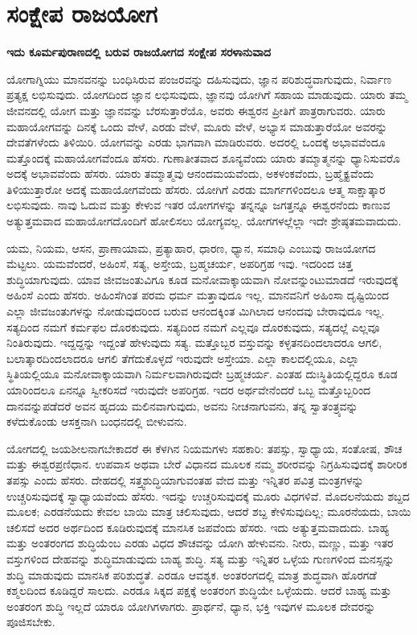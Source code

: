 \chapter{ಸಂಕ್ಷೇಪ ರಾಜಯೋಗ}

\centerline{\textbf{ಇದು ಕೂರ್ಮಪುರಾಣದಲ್ಲಿ ಬರುವ ರಾಜಯೋಗದ ಸಂಕ್ಷೇಪ ಸರಳಾನುವಾದ}}

ಯೋಗಾಗ್ನಿಯು ಮಾನವನನ್ನು ಬಂಧಿಸಿರುವ ಪಂಜರವನ್ನು ದಹಿಸುವುದು, ಜ್ಞಾನ ಪರಿಶುದ್ಧವಾಗುವುದು, ನಿರ್ವಾಣ ಪ್ರತ್ಯಕ್ಷ ಲಭಿಸುವುದು. ಯೋಗದಿಂದ ಜ್ಞಾನ ಲಭಿಸುವುದು, ಜ್ಞಾನವು ಯೋಗಿಗೆ ಸಹಾಯ ಮಾಡುವುದು. ಯಾರು ತಮ್ಮ ಜೀವನದಲ್ಲಿ ಯೋಗ ಮತ್ತು ಜ್ಞಾನವನ್ನು ಬೆರಸುತ್ತಾರೆಯೊ, ಅವರು ಈಶ್ವರನ ಪ್ರೀತಿಗೆ ಪಾತ್ರರಾಗುವರು. ಯಾರು ಮಹಾಯೋಗವನ್ನು ದಿನಕ್ಕೆ ಒಂದು ವೇಳೆ, ಎರಡು ವೇಳೆ, ಮೂರು ವೇಳೆ, ಅಭ್ಯಾಸ ಮಾಡುತ್ತಾರೆಯೋ ಅವರನ್ನು ದೇವತೆಗಳೆಂದು ತಿಳಿಯಿರಿ. ಯೋಗವನ್ನು ಎರಡು ಭಾಗವಾಗಿ ಮಾಡಿರುವರು. ಅದರಲ್ಲಿ ಒಂದಕ್ಕೆ ಅಭಾವವೆಂದೂ ಮತ್ತೊಂದಕ್ಕೆ ಮಹಾಯೋಗವೆಂದೂ ಹೆಸರು. ಗುಣಾತೀತವಾದ ಶೂನ್ಯವೆಂದು ಯಾರು ತಮ್ಮಾತ್ಮನನ್ನು ಧ್ಯಾನಿಸುವರೊ ಅದಕ್ಕೆ ಅಭಾವವೆಂದು ಹೆಸರು. ಯಾರು ತಮ್ಮಾತ್ಮವು ಆನಂದಮಯವೆಂದು, ಅಕಳಂಕವೆಂದು, ಬ್ರಹ್ಮೈಕ್ಯವೆಂದು ತಿಳಿಯುತ್ತಾರೋ ಅದಕ್ಕೆ ಮಹಾಯೋಗವೆಂದು ಹೆಸರು. ಯೋಗಿಗೆ ಎರಡು ಮಾರ್ಗಗಳಿಂದಲೂ ಆತ್ಮ ಸಾಕ್ಷಾತ್ಕಾರ ಲಭಿಸುವುದು. ನಾವು ಓದುವ ಮತ್ತು ಕೇಳುವ ಇತರ ಯೋಗಗಳನ್ನು ತನ್ನನ್ನೂ ಜಗತ್ತನ್ನೂ ಈಶ್ವರನೆಂದು ಕಾಣುವ ಅತ್ಯುತ್ತಮವಾದ ಮಹಾಯೋಗದೊಂದಿಗೆ ಹೋಲಿಸಲು ಯೋಗ್ಯವಲ್ಲ. ಯೋಗಗಳಲ್ಲೆಲ್ಲಾ ಇದೇ ಶ್ರೇಷ್ಠತಮವಾದುದು. 

ಯಮ, ನಿಯಮ, ಆಸನ, ಪ್ರಾಣಾಯಾಮ, ಪ್ರತ್ಯಾಹಾರ, ಧಾರಣ, ಧ್ಯಾನ, ಸಮಾಧಿ ಎಂಬುವು ರಾಜಯೋಗದ ಮೆಟ್ಟಲು. ಯಮವೆಂದರೆ, ಅಹಿಂಸೆ, ಸತ್ಯ, ಅಸ್ತೇಯ, ಬ್ರಹ್ಮಚರ್ಯ, ಅಪರಿಗ್ರಹ ಇವು. ಇದರಿಂದ ಚಿತ್ತ ಶುದ್ಧಿಯಾಗುವುದು. ಯಾವ ಜೀವಜಂತುವಿಗೂ ಕೂಡ ಮನೋವಾಕ್ಕಾಯವಾಗಿ ನೋವನ್ನುಂಟುಮಾಡದೆ ಇರುವುದಕ್ಕೆ ಅಹಿಂಸೆ ಎಂದು ಹೆಸರು. ಅಹಿಂಸೆಗಿಂತ ಪರಮ ಧರ್ಮ ಮತ್ತಾವುದೂ ಇಲ್ಲ. ಮಾನವನಿಗೆ ಅಹಿಂಸಾ ದೃಷ್ಟಿಯಿಂದ ಎಲ್ಲಾ ಜೀವಜಂತುಗಳನ್ನು ನೋಡುವುದರಿಂದ ಬರುವ ಆನಂದಕ್ಕಿಂತ ಮಿಗಿಲಾದ ಆನಂದವು ಬೇರಾವುದೂ ಇಲ್ಲ. ಸತ್ಯದಿಂದ ನಮಗೆ ಕರ್ಮಫಲ ದೊರಕುವುದು. ಸತ್ಯದಿಂದ ನಮಗೆ ಎಲ್ಲವೂ ದೊರಕುವುದು, ಸತ್ಯದಲ್ಲೆ ಎಲ್ಲವೂ ನಿಂತಿರುವುದು. ಇದ್ದದ್ದನ್ನು ಇದ್ದಂತೆ ಹೇಳುವುದು ಸತ್ಯ. ಮತ್ತೊಬ್ಬರ ವಸ್ತುವನ್ನು ಕಳ್ಳತನದಿಂದಲಾದರೂ ಆಗಲಿ, ಬಲಾತ್ಕಾರದಿಂದಲಾದರೂ ಆಗಲಿ ತೆಗೆದುಕೊಳ್ಳದೆ ಇರುವುದೇ ಅಸ್ತೇಯಾ. ಎಲ್ಲಾ ಕಾಲದಲ್ಲಿಯೂ, ಎಲ್ಲಾ ಸ್ಥಿತಿಯಲ್ಲಿಯೂ ಮನೋವಾಕ್ಕಾಯವಾಗಿ ನಿರ್ಮಲವಾಗಿರುವುದೇ ಬ್ರಹ್ಮಚರ್ಯ. ಎಂತಹ ದುಃಸ್ಥಿತಿಯಲ್ಲಿದ್ದರೂ ಕೂಡ ಯಾರಿಂದಲೂ ಏನನ್ನೂ ಸ್ವೀಕರಿಸದೆ ಇರುವುದೇ ಅಪರಿಗ್ರಹ. ಇದರ ಅರ್ಥವೇನೆಂದರೆ ಒಬ್ಬ ಮತ್ತೊಬ್ಬರಿಂದ ದಾನವನ್ನು\break ಪಡೆದರೆ ಅವನ ಹೃದಯ ಮಲಿನವಾಗುವುದು, ಅವನು ನೀಚನಾಗುವನು, ತನ್ನ ಸ್ವಾತಂತ್ರ್ಯವನ್ನು ಕಳೆದುಕೊಂಡು ಆಸಕ್ತನಾಗಿ ಬಂಧನದಲ್ಲಿ ಬೀಳುವನು. 

ಯೋಗದಲ್ಲಿ ಜಯಶೀಲನಾಗಬೇಕಾದರೆ ಈ ಕೆಳಗಿನ ನಿಯಮಗಳು ಸಹಕಾರಿ: ತಪಸ್ಸು, ಸ್ವಾಧ್ಯಾಯ, ಸಂತೋಷ, ಶೌಚ ಮತ್ತು ಈಶ್ವರಪ್ರಣಿಧಾನ. ಉಪವಾಸ ಅಥವಾ ಬೇರೆ ವಿಧಾನದ ಮೂಲಕ ನಮ್ಮ ಶರೀರವನ್ನು ನಿಗ್ರಹಿಸುವುದಕ್ಕೆ ಶಾರೀರಿಕ ತಪಸ್ಸು ಎಂದು ಹೆಸರು. ದೇಹದಲ್ಲಿ ಸತ್ತ್ವಶುದ್ಧಿಯಾಗುವಂತಹ ವೇದ ಮತ್ತು ಇನ್ನಿತರ ಪವಿತ್ರ ಮಂತ್ರಗಳನ್ನು ಉಚ್ಚರಿಸುವುದಕ್ಕೆ ಸ್ವಾಧ್ಯಾಯವೆಂದು ಹೆಸರು. ಇದನ್ನು ಉಚ್ಚರಿಸುವುದಕ್ಕೆ ಮೂರು ವಿಧಗಳಿವೆ. ಮೊದಲನೆಯದು ಶಬ್ದದ ಮೂಲಕ; ಎರಡನೆಯದು ಕೇವಲ ಬಾಯಿ ಮಾತ್ರ ಚಲಿಸುವುದು, ಆದರೆ ಶಬ್ದ ಕೇಳಿಸುವುದಿಲ್ಲ; ಮೂರನೆಯದು, ಬಾಯಿ ಚಲಿಸದೆ ಅದರ ಅರ್ಥದಿಂದ ಕೂಡಿರುವುದಕ್ಕೆ ಮಾನಸಿಕ ಜಪವೆಂದು ಹೆಸರು. ಇದು ಅತ್ಯುತ್ತಮವಾದುದು. ಬಾಹ್ಯ ಮತ್ತು ಅಂತರಂಗದ ಶುದ್ಧಿಯೆಂಬ ಎರಡು ವಿಧದ ಶೌಚವನ್ನು ಯೋಗಿ ಹೇಳುವನು. ನೀರು, ಮಣ್ಣು, ಮತ್ತು ಇತರ ವಸ್ತುಗಳಿಂದ ದೇಹವನ್ನು ಶುದ್ಧಿಮಾಡುವುದು ಬಾಹ್ಯ ಶುದ್ಧಿ. ಸತ್ಯ ಮತ್ತು ಇನ್ನಿತರ ಒಳ್ಳೆಯ ಗುಣಗಳಿಂದ ಮನಸ್ಸನ್ನು ಶುದ್ಧಿ ಮಾಡುವುದು ಮಾನಸಿಕ ಪರಿಶುದ್ಧತೆ. ಎರಡೂ ಆವಶ್ಯಕ. ಅಂತರಂಗದಲ್ಲಿ ಮಾತ್ರ ಶುದ್ಧವಾಗಿ ಹೊರಗಡೆ ಕಶ್ಮಲದಿಂದ ಕೂಡಿದ್ದರೆ ಸಾಲದು. ಎರಡೂ ಸಿಕ್ಕದ ಪಕ್ಷಕ್ಕೆ ಅಂತರಂಗ ಶುದ್ಧಿಯೇ ಒಳ್ಳೆಯದು. ಆದರೆ ಬಾಹ್ಯ ಮತ್ತು ಅಂತರಂಗ ಶುದ್ಧಿ ಇಲ್ಲದೆ ಯಾರೂ ಯೋಗಿಗಳಾಗರು. ಪ್ರಾರ್ಥನೆ, ಧ್ಯಾನ, ಭಕ್ತಿ ಇವುಗಳ ಮೂಲಕ ದೇವರನ್ನು ಪೂಜಿಸಬೇಕು. 

